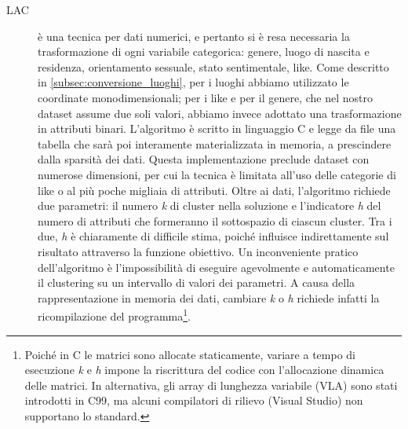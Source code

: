 \begin{description}
\item[LAC] \`e una tecnica per dati numerici, e pertanto si \`e resa necessaria la trasformazione di ogni variabile categorica: genere, luogo di nascita e residenza, orientamento sessuale, stato sentimentale, like. Come descritto in \autoref{subsec:conversione_luoghi}, per i luoghi abbiamo utilizzato le coordinate monodimensionali; per i like e per il genere, che nel nostro dataset assume due soli valori, abbiamo invece adottato una trasformazione in attributi binari.
L'algoritmo \`e scritto in linguaggio C e legge da file una tabella che sar\`a poi interamente materializzata in memoria, a prescindere dalla sparsit\`a dei dati. Questa implementazione preclude dataset con numerose dimensioni, per cui la tecnica \`e limitata all'uso delle categorie di like o al pi\`u poche migliaia di attributi. Oltre ai dati, l'algoritmo richiede due parametri: il numero \textit{k} di cluster nella soluzione e l'indicatore \textit{h} del numero di attributi che formeranno il sottospazio di ciascun cluster. Tra i due, \textit{h} \`e chiaramente di difficile stima, poich\'e influisce indirettamente sul risultato attraverso la funzione obiettivo. Un inconveniente pratico dell'algoritmo \`e l'impossibilit\`a di eseguire agevolmente e automaticamente il clustering su un intervallo di valori dei parametri. A causa della rappresentazione in memoria dei dati, cambiare \textit{k} o \textit{h} richiede infatti la ricompilazione del programma\footnote{Poich\'e in C le matrici sono allocate staticamente, variare a tempo di esecuzione \textit{k} e \textit{h} impone la riscrittura del codice con l'allocazione dinamica delle matrici. In alternativa, gli array di lunghezza variabile (VLA) sono stati introdotti in C99, ma alcuni compilatori di rilievo (Visual Studio) non supportano lo standard.}.

\end{description}
